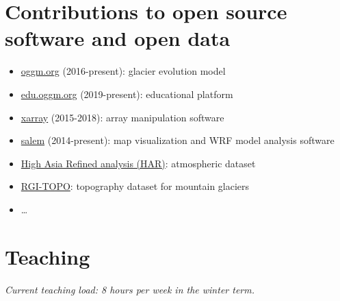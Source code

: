 \section*{Contributions to open source software and open data}
\label{\detokenize{ch08/cv:contributions-to-open-source-software-and-open-data}}\begin{itemize}[nosep]
\item {} 
\href{http://oggm.org}{oggm.org} (2016-present): glacier evolution model

\item {} 
\href{http://edu.oggm.org}{edu.oggm.org} (2019-present): educational platform

\item {} 
\href{http://xarray.pydata.org}{xarray} (2015-2018): array manipulation software

\item {} 
\href{https://salem.readthedocs.io}{salem} (2014-present): map visualization and WRF model analysis software

\item {} 
\href{https://www.klima.tu-berlin.de/HAR}{High Asia Refined analysis (HAR)}: atmospheric dataset

\item {} 
\href{https://rgitools.readthedocs.io/en/latest/dems.html}{RGI-TOPO}: topography dataset for mountain glaciers

\item {} 
…

\end{itemize}


\section*{Teaching}
\label{\detokenize{ch08/cv:teaching}}
\textit{Current teaching load: 8 hours per week in the winter term.}

